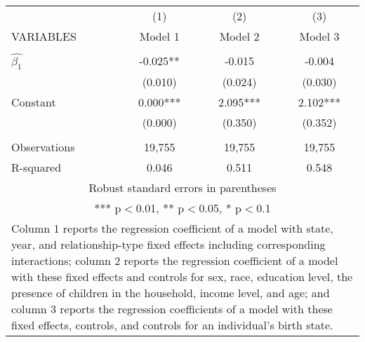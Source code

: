 \begin{tabular}{lccc}
\hline
 & (1) & (2) & (3) \\
VARIABLES & Model 1 & Model 2 & Model 3 \\ \hline
 &  &  &  \\
$\hat{\beta_1}$ & -0.025** & -0.015 & -0.004 \\
 & (0.010) & (0.024) & (0.030) \\
Constant & 0.000*** & 2.095*** & 2.102*** \\
 & (0.000) & (0.350) & (0.352) \\
 &  &  &  \\
Observations & 19,755 & 19,755 & 19,755 \\
 R-squared & 0.046 & 0.511 & 0.548 \\ \hline
\multicolumn{4}{c}{ Robust standard errors in parentheses} \\
\multicolumn{4}{c}{ *** p$<$0.01, ** p$<$0.05, * p$<$0.1} \\
\multicolumn{4}{p{0.8\linewidth}}{\small Column 1 reports the regression coefficient of a model with state, year, and relationship-type fixed effects including corresponding interactions; column 2 reports the regression coefficient of a model with these fixed effects and controls for sex, race, education level, the presence of children in the household, income level, and age; and column 3 reports the regression coefficients of a model with these fixed effects, controls, and controls for an individual’s birth state.} \\
\end{tabular}
